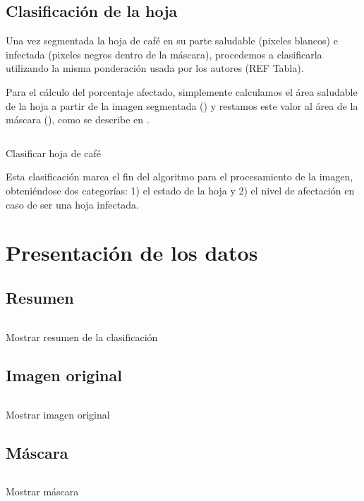 \subsection{Clasificación de la hoja}
Una vez segmentada la hoja de café en su parte saludable (pixeles blancos) e infectada (pixeles negros dentro de la máscara), procedemos a clasificarla utilizando la misma ponderación usada por los autores (REF Tabla).

Para el cálculo del porcentaje afectado, simplemente calculamos el área saludable de la hoja a partir de la imagen segmentada () y restamos este valor al área de la máscara (), como se describe en .

\begin{listing}[!ht]
\inputminted{python}{code_listings/categorize.py}
\caption{Clasificar hoja de café}
\label{code:categorize}
\end{listing}

Esta clasificación marca el fin del algoritmo para el procesamiento de la imagen, obteniéndose dos categorías: 1) el estado de la hoja y 2) el nivel de afectación en caso de ser una hoja infectada.

\section{Presentación de los datos}

\subsection{Resumen}
\begin{listing}[!ht]
\inputminted{python}{code_listings/show_summary.py}
\caption{Mostrar resumen de la clasificación}
\label{code:show_summary}
\end{listing}

\subsection{Imagen original}
\begin{listing}[!ht]
\inputminted{python}{code_listings/show_original_image.py}
\caption{Mostrar imagen original}
\label{code:show_original_image}
\end{listing}

\subsection{Máscara}
\begin{listing}[!ht]
\inputminted{python}{code_listings/show_mask.py}
\caption{Mostrar máscara}
\label{code:show_mask}
\end{listing}

